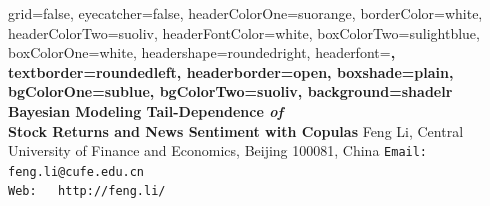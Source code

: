 \documentclass[a0paper,portrait,fontscale = 0.39,margin=2.5em]{baposter/baposter}
\begin{document}


\begin{poster}{
    grid=false,
    eyecatcher=false,
    headerColorOne=suorange,
    borderColor=white,
    headerColorTwo=suoliv,
    headerFontColor=white,
    boxColorTwo=sulightblue,
    boxColorOne=white,
    headershape=roundedright,
    headerfont=\Large\sf\bf,
    textborder=roundedleft,
    headerborder=open,
    boxshade=plain,
    bgColorOne=sublue,
    bgColorTwo=suoliv,
    background=shadelr
  }
  {
  }
  {\sf \bf \Huge
    {\color{white}  \textbf{Bayesian  Modeling Tail-Dependence \emph{of}\\
        Stock Returns and News Sentiment  with Copulas}}
  }
  {
    {\color{suorange} {\newline   Feng Li, Central University of Finance and Economics,
        Beijing 100081, China}
      \vspace{0.2cm}
      \newline \texttt{Email: feng.li@cufe.edu.cn}\\
      \texttt{Web:~~   http://feng.li/}
    }
  }
  {
    \setlength\fboxsep{0pt}
    \setlength\fboxrule{0.0pt}
  }


\end{poster}
\end{document}
